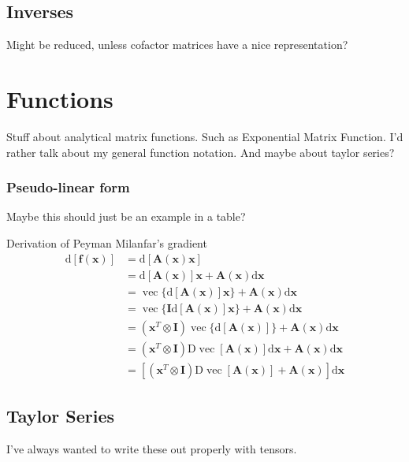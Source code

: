\documentclass[oneside]{book}
\begin{document}
\section{Inverses}
Might be reduced, unless cofactor matrices have a nice representation?


\chapter{Functions}
Stuff about analytical matrix functions.
Such as Exponential Matrix Function.
I'd rather talk about my general function notation.
And maybe about taylor series?

\subsection{Pseudo-linear form}
Maybe this should just be an example in a table?

Derivation of Peyman Milanfar's gradient
\begin{align*}
\mathrm{d}[\mathbf{f}(\mathbf{x})] & =\mathrm{d}[\mathbf{A}(\mathbf{x}) \mathbf{x}] \\
& =\mathrm{d}[\mathbf{A}(\mathbf{x})] \mathbf{x}+\mathbf{A}(\mathbf{x}) \mathrm{d} \mathbf{x} \\
& =\operatorname{vec}\{\mathrm{d}[\mathbf{A}(\mathbf{x})] \mathbf{x}\}+\mathbf{A}(\mathbf{x}) \mathrm{d} \mathbf{x} \\
& =\operatorname{vec}\{\mathbf{I} \mathrm{d}[\mathbf{A}(\mathbf{x})] \mathbf{x}\}+\mathbf{A}(\mathbf{x}) \mathrm{d} \mathbf{x} \\
& =\left(\mathbf{x}^T \otimes \mathbf{I}\right) \operatorname{vec}\{\mathrm{d}[\mathbf{A}(\mathbf{x})]\}+\mathbf{A}(\mathbf{x}) \mathrm{d} \mathbf{x} \\
& =\left(\mathbf{x}^T \otimes \mathbf{I}\right) \mathrm{D} \operatorname{vec}[\mathbf{A}(\mathbf{x})] \mathrm{d} \mathbf{x}+\mathbf{A}(\mathbf{x}) \mathrm{d} \mathbf{x} \\
& =\left[\left(\mathbf{x}^T \otimes \mathbf{I}\right) \mathrm{D} \operatorname{vec}[\mathbf{A}(\mathbf{x})]+\mathbf{A}(\mathbf{x})\right] \mathrm{d} \mathbf{x}
\end{align*}



\section{Taylor Series}
I've always wanted to write these out properly with tensors.
\end{document}
